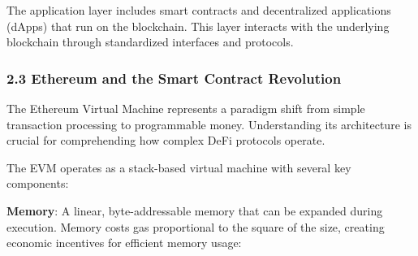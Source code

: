 \documentclass[12pt]{article}
\begin{document}
The application layer includes smart contracts and decentralized applications (dApps) that run on the blockchain. This layer interacts with the underlying blockchain through standardized interfaces and protocols.

\subsubsection{2.3 Ethereum and the Smart Contract Revolution} %

The Ethereum Virtual Machine represents a paradigm shift from simple transaction processing to programmable money. Understanding its architecture is crucial for comprehending how complex DeFi protocols operate.


The EVM operates as a stack-based virtual machine with several key components:

\textbf{Memory}: A linear, byte-addressable memory that can be expanded during execution. Memory costs gas proportional to the square of the size, creating economic incentives for efficient memory usage:
\end{document}
